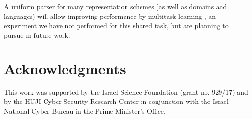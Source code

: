 \documentclass[11pt,a4paper]{article}
\begin{document}
A uniform parser for many representation schemes (as well as domains and languages)
will allow improving performance by multitask learning \cite{hershcovich2018multitask},
an experiment we have not performed for this shared task, but are planning to pursue in future work.


\section*{Acknowledgments}

This work was supported by the Israel Science Foundation (grant no. 929/17) and
by the HUJI Cyber Security Research Center
in conjunction with the Israel National Cyber Bureau in the Prime Minister's Office.





\end{document}

